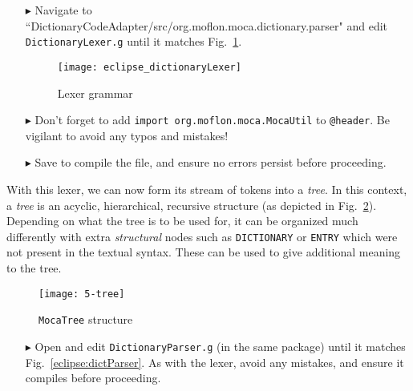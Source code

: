 \begin{itemize}
  
\item[$\blacktriangleright$] Navigate to ``Diction\-ary\-Code\-Adap\-ter/src/org.moflon.moca.dict\-ion\-ary\-.pars\-er" and edit \texttt{DictionaryLexer.g}
until it matches Fig.~\ref{eclipse:dictionaryLexer}. 


\newpage

\begin{figure}[!htbp]
\begin{center}
  \texttt{[image: eclipse\_dictionaryLexer]}
  \caption{Lexer grammar}
  \label{eclipse:dictionaryLexer}
\end{center}
\end{figure}

\item[$\blacktriangleright$] Don't forget to add \texttt{import org.moflon.moca.MocaUtil} to \texttt{@header}. Be vigilant to avoid any typos and mistakes!

\item[$\blacktriangleright$] Save to compile the file, and ensure no errors persist before proceeding.

\end{itemize}

With this lexer, we can now form its stream of tokens into a \emph{tree}. In this context, a \emph{tree} is an acyclic, hierarchical, recursive structure (as
depicted in Fig.~\ref{eclipse:dictLexer}). Depending on what the tree is to be used for, it can be organized much differently with extra \emph{structural} nodes
such as \texttt{DICTIONARY} or \texttt{ENTRY} which were not present in the textual syntax. These can be used to give additional meaning to the tree.

\begin{figure}[htp]
\begin{center}
 \texttt{[image: 5-tree]}
  \caption{\texttt{MocaTree} structure}
  \label{eclipse:dictLexer}
\end{center}
\end{figure}

\begin{itemize}

\item[$\blacktriangleright$] Open and edit \texttt{DictionaryParser.g} (in the same package) until it matches Fig.~\ref{eclipse:dictParser}. As with
the lexer, avoid any mistakes, and ensure it compiles before proceeding.

\end{itemize}


